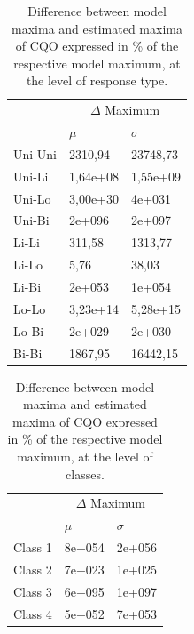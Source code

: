 			\begin{table}[h!]		
			
				\normalsize
				\caption{Difference between model maxima and estimated maxima of CQO expressed in \% of the respective model maximum, at the level of response type.}
				\centering
				
				\begin{tabular}{@{}lll@{}}
					\toprule	
					& \multicolumn{2}{c}{$\Delta$ Maximum} \\ \cmidrule{2-3}	
					& $\mu$   & $\sigma$   \\	
					\hline
					Uni-Uni & 2310,94  & 23748,73 \\
					Uni-Li  & 1,64e+08 & 1,55e+09 \\
					Uni-Lo  & 3,00e+30 & 4e+031   \\	
					Uni-Bi  & 2e+096   & 2e+097   \\
					Li-Li   & 311,58   & 1313,77  \\	
					Li-Lo   & 5,76     & 38,03    \\
					Li-Bi   & 2e+053   & 1e+054   \\
					Lo-Lo   & 3,23e+14 & 5,28e+15 \\
					Lo-Bi   & 2e+029   & 2e+030   \\
					Bi-Bi   & 1867,95  & 16442,15 \\
					\toprule
				\end{tabular}
				
				\label{tab:cqosm4}
				
			\end{table}
		
			\begin{table}[h!]   
			
				\normalsize
				\caption{Difference between model maxima and estimated maxima of CQO expressed in \% of the respective model maximum, at the level of classes.}
				\centering
				
				\begin{tabular}{@{}lll@{}}
					\toprule
					& \multicolumn{2}{c}{$\Delta$ Maximum} \\ \cmidrule{2-3}
					& $\mu$   & $\sigma$   \\
					\hline
					Class 1 & 8e+054 & 2e+056 \\
					Class 2 & 7e+023 & 1e+025 \\
					Class 3 & 6e+095 & 1e+097 \\
					Class 4 & 5e+052 & 7e+053 \\
					\toprule
				\end{tabular}
			
				\label{tab:cqosm5}
				
		\end{table}
		
